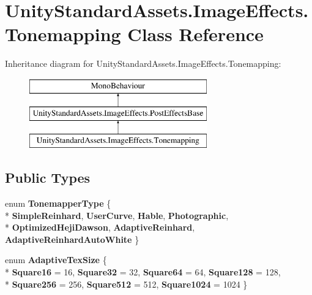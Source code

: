 \hypertarget{class_unity_standard_assets_1_1_image_effects_1_1_tonemapping}{}\section{Unity\+Standard\+Assets.\+Image\+Effects.\+Tonemapping Class Reference}
\label{class_unity_standard_assets_1_1_image_effects_1_1_tonemapping}
Inheritance diagram for Unity\+Standard\+Assets.\+Image\+Effects.\+Tonemapping\+:\begin{figure}[H]
\begin{center}
\leavevmode
\includegraphics[height=3.000000cm]{class_unity_standard_assets_1_1_image_effects_1_1_tonemapping}
\end{center}
\end{figure}
\subsection*{Public Types}
\begin{DoxyCompactItemize}
\item 
enum {\bfseries Tonemapper\+Type} \{ \\*
{\bfseries Simple\+Reinhard}, 
{\bfseries User\+Curve}, 
{\bfseries Hable}, 
{\bfseries Photographic}, 
\\*
{\bfseries Optimized\+Heji\+Dawson}, 
{\bfseries Adaptive\+Reinhard}, 
{\bfseries Adaptive\+Reinhard\+Auto\+White}
 \}\hypertarget{class_unity_standard_assets_1_1_image_effects_1_1_tonemapping_abdf231516a590a7b08ef8503048a3d33}{}\label{class_unity_standard_assets_1_1_image_effects_1_1_tonemapping_abdf231516a590a7b08ef8503048a3d33}

\item 
enum {\bfseries Adaptive\+Tex\+Size} \{ \\*
{\bfseries Square16} = 16, 
{\bfseries Square32} = 32, 
{\bfseries Square64} = 64, 
{\bfseries Square128} = 128, 
\\*
{\bfseries Square256} = 256, 
{\bfseries Square512} = 512, 
{\bfseries Square1024} = 1024
 \}\hypertarget{class_unity_standard_assets_1_1_image_effects_1_1_tonemapping_affa06af2bce28037fc1882c70b7b2131}{}\label{class_unity_standard_assets_1_1_image_effects_1_1_tonemapping_affa06af2bce28037fc1882c70b7b2131}

\end{DoxyCompactItemize}
